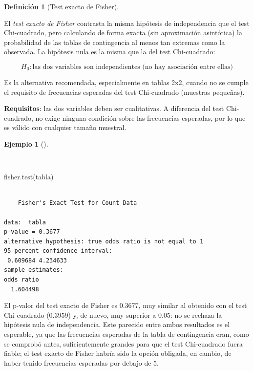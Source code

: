 \documentclass[
  spanish,
  a4paper,
]{scrreport}
\newenvironment{Shaded}{\begin{snugshade}}{\end{snugshade}}
\newcommand{\FunctionTok}[1]{\textcolor[rgb]{0.28,0.35,0.67}{#1}}
\newcommand{\NormalTok}[1]{\textcolor[rgb]{0.00,0.23,0.31}{#1}}
\theoremstyle{definition}
\newtheorem{example}{Ejemplo}[chapter]
\theoremstyle{definition}
\newtheorem{definition}{Definición}[chapter]
\theoremstyle{remark}
\begin{document}
\begin{definition}[Test exacto de
Fisher]\protect\hypertarget{def-dosindep-test-fisher}{}\label{def-dosindep-test-fisher}

El \emph{test exacto de Fisher} contrasta la misma hipótesis de
independencia que el test Chi-cuadrado, pero calculando de forma exacta
(sin aproximación asintótica) la probabilidad de las tablas de
contingencia al menos tan extremas como la observada. La hipótesis nula
es la misma que la del test Chi-cuadrado:

\[H_0: \mbox{las dos variables son independientes (no hay asociación entre ellas)}\]

Es la alternativa recomendada, especialmente en tablas 2x2, cuando no se
cumple el requisito de frecuencias esperadas del test Chi-cuadrado
(muestras pequeñas).

\end{definition}

\textbf{Requisitos}: las dos variables deben ser cualitativas. A
diferencia del test Chi-cuadrado, no exige ninguna condición sobre las
frecuencias esperadas, por lo que es válido con cualquier tamaño
muestral.

\begin{example}[]\protect\hypertarget{exm-dosindep-test-fisher}{}\label{exm-dosindep-test-fisher}

~

\begin{Shaded}
\begin{Highlighting}[]
\FunctionTok{fisher.test}\NormalTok{(tabla)}
\end{Highlighting}
\end{Shaded}

\begin{verbatim}

    Fisher's Exact Test for Count Data

data:  tabla
p-value = 0.3677
alternative hypothesis: true odds ratio is not equal to 1
95 percent confidence interval:
 0.609684 4.234633
sample estimates:
odds ratio 
  1.604498 
\end{verbatim}

El p-valor del test exacto de Fisher es 0.3677, muy similar al obtenido
con el test Chi-cuadrado (0.3959) y, de nuevo, muy superior a 0.05: no
se rechaza la hipótesis nula de independencia. Este parecido entre ambos
resultados es el esperable, ya que las frecuencias esperadas de la tabla
de contingencia eran, como se comprobó antes, suficientemente grandes
para que el test Chi-cuadrado fuera fiable; el test exacto de Fisher
habría sido la opción obligada, en cambio, de haber tenido frecuencias
esperadas por debajo de 5.

\end{example}
\end{document}
